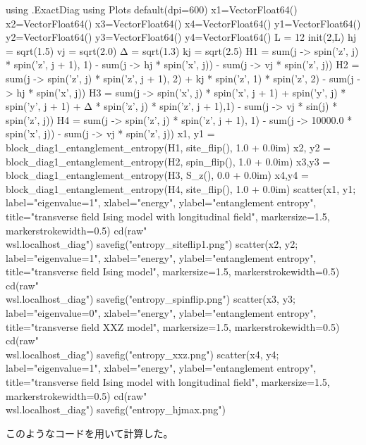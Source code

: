\documentclass{ltjsarticle}
\begin{document}
\begin{jllisting}
using .ExactDiag
using Plots
default(dpi=600)
x1=Vector{Float64}()
x2=Vector{Float64}()
x3=Vector{Float64}()
x4=Vector{Float64}()
y1=Vector{Float64}()
y2=Vector{Float64}()
y3=Vector{Float64}()
y4=Vector{Float64}()
L = 12
init(2,L)
hj = sqrt(1.5)
vj = sqrt(2.0)
Δ = sqrt(1.3)
kj = sqrt(2.5)
H1 = sum(j -> spin('z', j) * spin('z', j + 1), 1) - sum(j -> hj * spin('x', j)) - sum(j -> vj * spin('z', j))
H2 = sum(j -> spin('z', j) * spin('z', j + 1), 2) + kj * spin('z', 1) * spin('z', 2) - sum(j -> hj * spin('x', j))
H3 = sum(j -> spin('x', j) * spin('x', j + 1) + spin('y', j) * spin('y', j + 1) + Δ * spin('z', j) * spin('z', j + 1),1) - sum(j -> vj * sin(j) * spin('z', j))
H4 = sum(j -> spin('z', j) * spin('z', j + 1), 1) - sum(j -> 10000.0 * spin('x', j)) - sum(j -> vj * spin('z', j))
x1, y1 = block_diag1_entanglement_entropy(H1, site_flip(), 1.0 + 0.0im)
x2, y2 = block_diag1_entanglement_entropy(H2, spin_flip(), 1.0 + 0.0im)
x3,y3 = block_diag1_entanglement_entropy(H3, S_z(), 0.0 + 0.0im)
x4,y4 = block_diag1_entanglement_entropy(H4, site_flip(), 1.0 + 0.0im)
scatter(x1, y1;
  label="eigenvalue=1",
  xlabel="energy",
  ylabel="entanglement entropy",
  title="transverse field Ising model with longitudinal field",
  markersize=1.5, markerstrokewidth=0.5)
cd(raw"\\wsl.localhost\Ubuntu\home\kokor\git\exact_diag")
savefig("entropy_siteflip1.png")
scatter(x2, y2;
  label="eigenvalue=1",
  xlabel="energy",
  ylabel="entanglement entropy",
  title="transverse field Ising model",
  markersize=1.5, markerstrokewidth=0.5)
cd(raw"\\wsl.localhost\Ubuntu\home\kokor\git\exact_diag")
savefig("entropy_spinflip.png")
scatter(x3, y3;
  label="eigenvalue=0",
  xlabel="energy",
  ylabel="entanglement entropy",
  title="transverse field XXZ model",
  markersize=1.5, markerstrokewidth=0.5)
cd(raw"\\wsl.localhost\Ubuntu\home\kokor\git\exact_diag")
savefig("entropy_xxz.png")
scatter(x4, y4;
  label="eigenvalue=1",
  xlabel="energy",
  ylabel="entanglement entropy",
  title="transverse field Ising model with longitudinal field",
  markersize=1.5, markerstrokewidth=0.5)
cd(raw"\\wsl.localhost\Ubuntu\home\kokor\git\exact_diag")
savefig("entropy_hjmax.png")
\end{jllisting}
このようなコードを用いて計算した。\\
\end{document}
